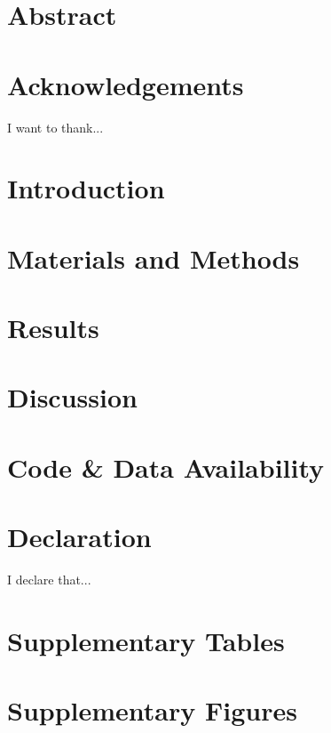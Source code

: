 \documentclass[12pt, oneside]{report}
\begin{document}


\chapter*{Abstract}


\chapter*{Acknowledgements}
I want to thank...

\tableofcontents
\listoffigures
\listoftables
\chapter{Introduction}
\label{chapter01}


\chapter{Materials and Methods}
\label{chapter02}


\chapter{Results}
\label{chapter03}


\chapter{Discussion}
\label{discussion}


\chapter*{Code \& Data Availability}

\chapter*{Declaration}
I declare that...

\appendix
\chapter{Supplementary Tables}

\chapter{Supplementary Figures}


\printbibliography
\end{document}
